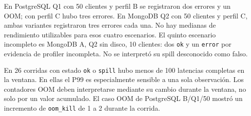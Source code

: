 \documentclass[12pt,letterpaper]{article}
\begin{document}
En PostgreSQL Q1 con 50 clientes y perfil B se registraron dos errores y un OOM; con perfil C hubo tres errores. En MongoDB Q2 con 50 clientes y perfil C, ambas variantes registraron tres errores cada una. No hay medianas de rendimiento utilizables para esos cuatro escenarios. El quinto escenario incompleto es MongoDB A, Q2 sin disco, 10 clientes: dos \texttt{ok} y un \texttt{error} por evidencia de profiler incompleta. No se interpretó su spill desconocido como falso.

En 26 corridas con estado \texttt{ok} o \texttt{spill} hubo menos de 100 latencias completas en la ventana. En ellas el P99 es especialmente sensible a una sola observación. Los contadores OOM deben interpretarse mediante su cambio durante la ventana, no solo por un valor acumulado. El caso OOM de PostgreSQL B/Q1/50 mostró un incremento de \texttt{oom\_\allowbreak{}kill} de 1 a 2 durante la corrida.
\end{document}
